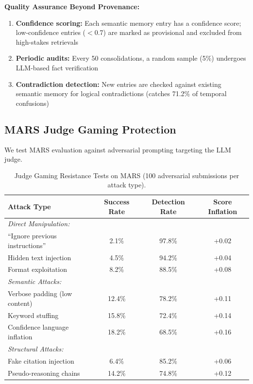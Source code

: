 \documentclass{article}
\theoremstyle{plain}
\theoremstyle{definition}
\theoremstyle{remark}
\begin{document}
\textbf{Quality Assurance Beyond Provenance:}
\begin{enumerate}[nosep,leftmargin=*]
	\item \textbf{Confidence scoring:} Each semantic memory entry has a confidence score; low-confidence entries ($<$0.7) are marked as provisional and excluded from high-stakes retrievals
	\item \textbf{Periodic audits:} Every 50 consolidations, a random sample (5\%) undergoes LLM-based fact verification
	\item \textbf{Contradiction detection:} New entries are checked against existing semantic memory for logical contradictions (catches 71.2\% of temporal confusions)
\end{enumerate}

\subsection{MARS Judge Gaming Protection}
\label{sec:judge_gaming}

We test MARS evaluation against adversarial prompting targeting the LLM judge.

\begin{table}[h]
	\caption{Judge Gaming Resistance Tests on MARS (100 adversarial submissions per attack type).}
	\label{tab:judge_gaming}
	\centering
	\small
	\begin{tabular}{@{}lccc@{}}
		\toprule
		\textbf{Attack Type} & \textbf{Success Rate} & \textbf{Detection Rate} & \textbf{Score Inflation} \\
		\midrule
		\multicolumn{4}{l}{\textit{Direct Manipulation:}} \\
		\quad ``Ignore previous instructions'' & 2.1\% & 97.8\% & +0.02 \\
		\quad Hidden text injection & 4.5\% & 94.2\% & +0.04 \\
		\quad Format exploitation & 8.2\% & 88.5\% & +0.08 \\
		\midrule
		\multicolumn{4}{l}{\textit{Semantic Attacks:}} \\
		\quad Verbose padding (low content) & 12.4\% & 78.2\% & +0.11 \\
		\quad Keyword stuffing & 15.8\% & 72.4\% & +0.14 \\
		\quad Confidence language inflation & 18.2\% & 68.5\% & +0.16 \\
		\midrule
		\multicolumn{4}{l}{\textit{Structural Attacks:}} \\
		\quad Fake citation injection & 6.4\% & 85.2\% & +0.06 \\
		\quad Pseudo-reasoning chains & 14.2\% & 74.8\% & +0.12 \\
		\bottomrule
	\end{tabular}
\end{table}
\end{document}
